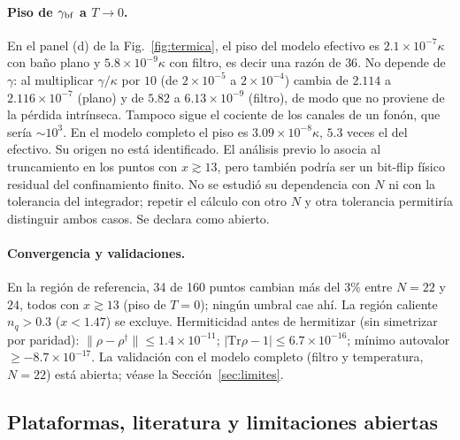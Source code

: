 \documentclass[11pt,a4paper]{article}
\theoremstyle{definition}
\begin{document}
\paragraph{Piso de $\gamma_{\rm bf}$ a $T\to0$.} En el panel (d) de la Fig.~\ref{fig:termica}, el piso del modelo efectivo es $2.1\times10^{-7}\kappa$ con baño plano y $5.8\times10^{-9}\kappa$ con filtro, es decir una razón de $36$. No depende de $\gamma$: al multiplicar $\gamma/\kappa$ por $10$ (de $2\times10^{-5}$ a $2\times10^{-4}$) cambia de $2.114$ a $2.116\times10^{-7}$ (plano) y de $5.82$ a $6.13\times10^{-9}$ (filtro), de modo que no proviene de la pérdida intrínseca. Tampoco sigue el cociente de los canales de un fonón, que sería $\sim10^{3}$. En el modelo completo el piso es $3.09\times10^{-8}\kappa$, $5.3$ veces el del efectivo. Su origen no está identificado. El análisis previo lo asocia al truncamiento en los puntos con $x\gtrsim13$, pero también podría ser un bit-flip físico residual del confinamiento finito. No se estudió su dependencia con $N$ ni con la tolerancia del integrador; repetir el cálculo con otro $N$ y otra tolerancia permitiría distinguir ambos casos. Se declara como abierto.

\paragraph{Convergencia y validaciones.} En la región de referencia, 34 de 160 puntos cambian más del $3\%$ entre $N=22$ y $24$, todos con $x\gtrsim13$ (piso de $T=0$); ningún umbral cae ahí. La región caliente $n_q>0.3$ ($x<1.47$) se excluye. Hermiticidad antes de hermitizar (sin simetrizar por paridad): $\|\rho-\rho^{\dagger}\|\leq1.4\times10^{-11}$; $|\mathrm{Tr}\rho-1|\leq6.7\times10^{-16}$; mínimo autovalor $\geq-8.7\times10^{-17}$. La validación con el modelo completo (filtro y temperatura, $N=22$) está abierta; véase la Sección~\ref{sec:limites}.

\subsection{Plataformas, literatura y limitaciones abiertas}
\label{sec:res_plat}
\end{document}
